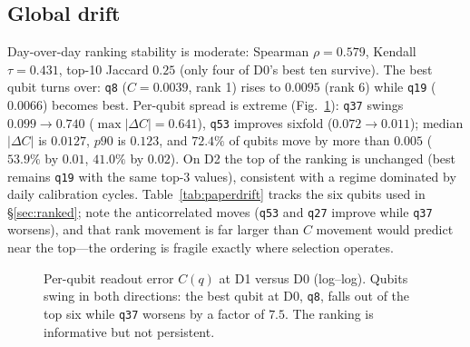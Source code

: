 \documentclass[journal,10pt,twocolumn]{IEEEtran}
\newcommand{\q}[1]{\texttt{q#1}}
\begin{document}
\subsection{Global drift}
\label{sec:driftglob}
Day-over-day ranking stability is moderate: Spearman $\rho{=}0.579$, Kendall $\tau{=}0.431$, top-10 Jaccard $0.25$
(only four of D0's best ten survive). The best qubit turns over: \q{8} ($C{=}0.0039$, rank 1) rises to $0.0095$
(rank 6) while \q{19} ($0.0066$) becomes best. Per-qubit spread is extreme (Fig.~\ref{fig:driftq}): \q{37} swings
$0.099{\to}0.740$ ($\max|\Delta C|{=}0.641$), \q{53} improves sixfold ($0.072{\to}0.011$); median $|\Delta C|$ is
$0.0127$, $p90$ is $0.123$, and $72.4\%$ of qubits move by more than $0.005$ ($53.9\%$ by $0.01$, $41.0\%$ by
$0.02$). On D2 the top of the ranking is unchanged (best remains \q{19} with the same top-3 values), consistent
with a regime dominated by daily calibration cycles. Table~\ref{tab:paperdrift} tracks the six qubits used in
\S\ref{sec:ranked}; note the anticorrelated moves (\q{53} and \q{27} improve while \q{37} worsens), and that rank
movement is far larger than $C$ movement would predict near the top---the ordering is fragile exactly where
selection operates.

\begin{figure}[t]
\centering
{}%
\caption{Per-qubit readout error $C(q)$ at D1 versus D0 (log--log). Qubits swing in both directions: the best qubit
at D0, \q{8}, falls out of the top six while \q{37} worsens by a factor of $7.5$. The ranking is informative but
not persistent.}
\label{fig:driftq}
\end{figure}
\end{document}
